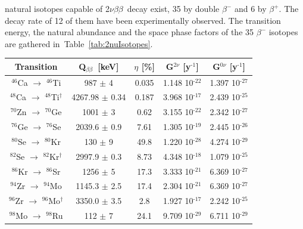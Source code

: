 \documentclass[main.tex]{subfiles}
\begin{document}
\bigskip


 natural isotopes capable of 2$\nu\beta\beta$~decay exist, 35 by double $\beta^{-}$ and 6 by $\beta^{+}$. The decay rate of 12 of them have been experimentally observed. The transition energy, the natural abundance and the space phase factors of the 35 $\beta^{-}$ isotopes are gathered in~Table~\ref{tab:2nuIsotopes}.




\begin{table}
\centering
\small
\begin{tabular}{|c|c|c|c|c|}
\hline
Transition & Q$_{\beta\beta}$~[keV] & $\eta$ [\%] & G$^{\text{2}\nu}$ [y$^{\text{-1}}$] & G$^{\text{0}\nu}$ [y$^{\text{-1}}$] \\
\hline
$^{\text{46}}$Ca $\rightarrow$ $^{\text{46}}$Ti & 987      $\pm$ 4   & 0.035  & 1.148 10$^{\text{-22}}$ & 1.397 10$^{\text{-27}}$\\
\hline
$^{\text{48}}$Ca $\rightarrow$ $^{\text{48}}$Ti$^{\dagger}$ & 4267.98     $\pm$ 0.34   & 0.187  & 3.968 10$^{\text{-17}}$ & 2.439 10$^{\text{-25}}$\\ 
\hline
$^{\text{70}}$Zn $\rightarrow$ $^{\text{70}}$Ge & 1001     $\pm$ 3   & 0.62   & 3.155 10$^{\text{-22}}$ & 2.342 10$^{\text{-27}}$\\ 
\hline
$^{\text{76}}$Ge $\rightarrow$ $^{\text{76}}$Se & 2039.6   $\pm$ 0.9 & 7.61   & 1.305 10$^{\text{-19}}$ & 2.445 10$^{\text{-26}}$\\ 
\hline
$^{\text{80}}$Se $\rightarrow$ $^{\text{80}}$Kr & 130      $\pm$ 9   & 49.8   & 1.220 10$^{\text{-28}}$ & 4.274 10$^{\text{-29}}$\\ 
\hline
$^{\text{82}}$Se $\rightarrow$ $^{\text{82}}$Kr$^{\dagger}$ & 2997.9   $\pm$ 0.3   & 8.73   & 4.348 10$^{\text{-18}}$ & 1.079 10$^{\text{-25}}$\\ 
\hline
$^{\text{86}}$Kr $\rightarrow$ $^{\text{86}}$Sr & 1256     $\pm$ 5   & 17.3   & 3.333 10$^{\text{-21}}$ & 6.369 10$^{\text{-27}}$\\ 
\hline
$^{\text{94}}$Zr $\rightarrow$ $^{\text{94}}$Mo & 1145.3   $\pm$ 2.5 & 17.4   & 2.304 10$^{\text{-21}}$ & 6.369 10$^{\text{-27}}$\\ 
\hline
$^{\text{96}}$Zr $\rightarrow$ $^{\text{96}}$Mo$^{\dagger}$ & 3350.0     $\pm$ 3.5   & 2.8    & 1.927 10$^{\text{-17}}$ & 2.242 10$^{\text{-25}}$\\ 
\hline
$^{\text{98}}$Mo $\rightarrow$ $^{\text{98}}$Ru & 112      $\pm$ 7   & 24.1   & 9.709 10$^{\text{-29}}$ & 6.711 10$^{\text{-29}}$\\ 

\end{tabular}
\end{table}
\end{document}

